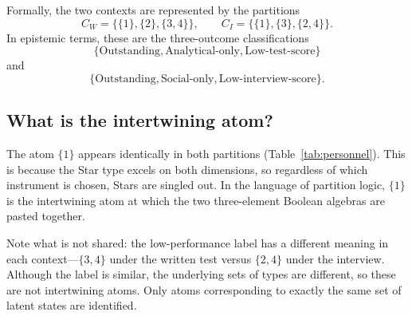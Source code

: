 \documentclass[aps,pra,twocolumn,superscriptaddress,floatfix,longbibliography]{revtex4-2}
\begin{document}
Formally, the two contexts are represented by the partitions
\begin{equation}
C_W=\{\{1\},\{2\},\{3,4\}\},
\qquad
C_I=\{\{1\},\{3\},\{2,4\}\}.
\label{eq:personnel_contexts}
\end{equation}
In epistemic terms, these are the three-outcome classifications
\[
\{\text{Outstanding},\text{Analytical-only},\text{Low-test-score}\}
\]
and
\[
\{\text{Outstanding},\text{Social-only},\text{Low-interview-score}\}.
\]

\subsection{What is the intertwining atom?}

The atom $\{1\}$ appears identically in both partitions
(Table~\ref{tab:personnel}). This is because the Star type excels on
both dimensions, so regardless of which instrument is chosen, Stars
are singled out. In the language of partition logic, $\{1\}$ is the
intertwining atom at which the two three-element Boolean algebras are
pasted together.

Note what is not shared: the low-performance label has a different
meaning in each context---$\{3,4\}$ under the written test versus
$\{2,4\}$ under the interview. Although the label is similar, the
underlying sets of types are different, so these are not
intertwining atoms. Only atoms corresponding to exactly the same set
of latent states are identified.
\end{document}
